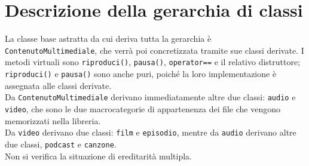 \documentclass[a4paper,10pt]{article}
\begin{document}
\section{Descrizione della gerarchia di classi}

La classe base astratta da cui deriva tutta la gerarchia è \texttt{ContenutoMultimediale}, che verrà poi concretizzata tramite sue classi derivate. I metodi virtuali sono \texttt{riproduci()}, \texttt{pausa()}, \texttt{operator==} e il relativo distruttore; \texttt{riproduci()} e \texttt{pausa()} sono anche puri, poiché la loro implementazione è assegnata alle classi derivate. \\
Da \texttt{ContenutoMultimediale} derivano immediatamente altre due classi: \texttt{audio} e \texttt{video}, che sono le due macrocategorie di appartenenza dei file che vengono memorizzati nella libreria. \\
Da \texttt{video} derivano due classi: \texttt{film} e \texttt{episodio}, mentre da \texttt{audio} derivano altre due classi, \texttt{podcast} e \texttt{canzone}. \\
Non si verifica la situazione di ereditarità multipla. \\
\end{document}
